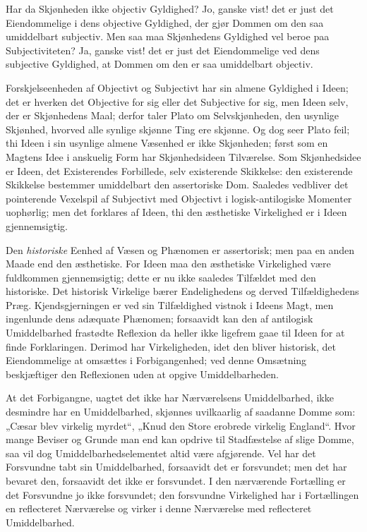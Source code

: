 \documentclass[12pt]{book}
\newcommand{\opage}[1]{\marginnote{\footnotesize\textit{[#1]}}}
\begin{document}
\opage{205}Har da Skjønheden ikke objectiv Gyldighed? Jo, ganske
vist! det er just det Eiendommelige i dens objective Gyldighed,
der gjør Dommen om den saa umiddelbart subjectiv. Men
saa maa Skjønhedens Gyldighed vel beroe paa Subjectiviteten?
Ja, ganske vist! det er just det Eiendommelige ved dens subjective
Gyldighed, at Dommen om den er saa umiddelbart
objectiv.

Forskjelseenheden af Objectivt og Subjectivt har sin
almene Gyldighed i Ideen; det er hverken det Objective for
sig eller det Subjective for sig, men Ideen selv, der er Skjønhedens
Maal; derfor taler Plato om Selvskjønheden, den
usynlige Skjønhed, hvorved alle synlige skjønne Ting ere
skjønne. Og dog seer Plato feil; thi Ideen i sin usynlige
almene Væsenhed er ikke Skjønheden; først som en Magtens
Idee i anskuelig Form har Skjønhedsideen Tilværelse.
Som Skjønhedsidee er Ideen, det Existerendes Forbillede,
selv existerende Skikkelse: den existerende Skikkelse bestemmer
umiddelbart den assertoriske Dom. Saaledes vedbliver det
pointerende Vexelspil af Subjectivt med Objectivt i logisk-antilogiske
Momenter uophørlig; men det forklares af Ideen,
thi den æsthetiske Virkelighed er i Ideen gjennemsigtig.

Den \emph{historiske} Eenhed af Væsen og Phænomen er assertorisk;
men paa en anden Maade end den æsthetiske. For
Ideen maa den æsthetiske Virkelighed være fuldkommen gjennemsigtig;
dette er nu ikke saaledes Tilfældet med den historiske.
Det historisk Virkelige bærer Endelighedens og derved Tilfældighedens
Præg. Kjendsgjerningen er ved sin Tilfældighed
vistnok i Ideens Magt, men ingenlunde dens adæquate Phænomen;
forsaavidt kan den af antilogisk Umiddelbarhed frastødte
Reflexion da heller ikke ligefrem gaae til Ideen for at
finde Forklaringen. Derimod har Virkeligheden, idet den
bliver historisk, det Eiendommelige at omsættes i Forbigangenhed;
ved denne Omsætning beskjæftiger den Reflexionen uden
at opgive Umiddelbarheden.

\opage{206}At det Forbigangne, uagtet det ikke har Nærværelsens
Umiddelbarhed, ikke desmindre har en Umiddelbarhed, skjønnes
uvilkaarlig af saadanne Domme som: „Cæsar blev virkelig
myrdet“, „Knud den Store erobrede virkelig England“.
Hvor mange Beviser og Grunde man end kan opdrive til
Stadfæstelse af slige Domme, saa vil dog Umiddelbarhedselementet
altid være afgjørende. Vel har det Forsvundne tabt
sin Umiddelbarhed, forsaavidt det er forsvundet; men det har
bevaret den, forsaavidt det ikke er forsvundet. I den nærværende
Fortælling er det Forsvundne jo ikke forsvundet; den forsvundne
Virkelighed har i Fortællingen en reflecteret Nærværelse
og virker i denne Nærværelse med reflecteret Umiddelbarhed.
\end{document}
